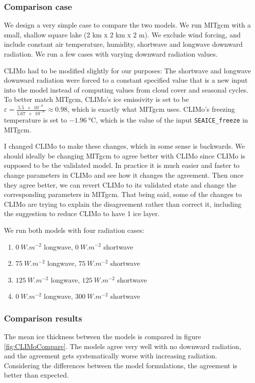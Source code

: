 \documentclass[11pt]{article}
\begin{document}
\subsubsection{Comparison case}
We design a very simple case to compare the two models. We run MITgcm with a small, shallow square lake (2 km x 2 km x 2 m). We exclude wind forcing, and include constant air temperature, humidity, shortwave and longwave downward radiation. We run a few cases with varying downward radiation values.

CLIMo had to be modified slightly for our purposes: The shortwave and longwave downward radiation were forced to a constant specified value that is a new input into the model instead of computing values from cloud cover and seasonal cycles. To better match MITgcm, CLIMo's ice emissivity is set to be $\varepsilon = \frac{\SI{5.5e-8}{}}{\SI{5.67e-8}{}} \approx 0.98$, which is exactly what MITgcm uses. CLIMo's freezing temperature is set to $\SI{-1.96}{\celsius}$, which is the value of the input \verb|SEAICE_freeze| in MITgcm.

I changed CLIMo to make these changes, which in some sense is backwards. We should ideally be changing MITgcm to agree better with CLIMo since CLIMo is supposed to be the validated model. In practice it is much easier and faster to change parameters in CLIMo and see how it changes the agreement. Then once they agree better, we can revert CLIMo to its validated state and change the corresponding parameters in MITgcm. That being said, some of the changes to CLIMo are trying to explain the disagreement rather than correct it, including the suggestion to reduce CLIMo to have 1 ice layer.

We run both models with four radiation cases:
\begin{enumerate}
\item{$\SI{0}{W.m^{-2}}$ longwave, $\SI{0}{W.m^{-2}}$ shortwave}
\item{$\SI{75}{W.m^{-2}}$ longwave, $\SI{75}{W.m^{-2}}$ shortwave}
\item{$\SI{125}{W.m^{-2}}$ longwave, $\SI{125}{W.m^{-2}}$ shortwave}
\item{$\SI{0}{W.m^{-2}}$ longwave, $\SI{300}{W.m^{-2}}$ shortwave}
\end{enumerate}

\subsubsection{Comparison results}
The mean ice thickness between the models is compared in figure \ref{fig:CLIMoCompare}. The models agree very well with no downward radiation, and the agreement gets systematically worse with increasing radiation. Considering the differences between the model formulations, the agreement is better than expected.
\end{document}
